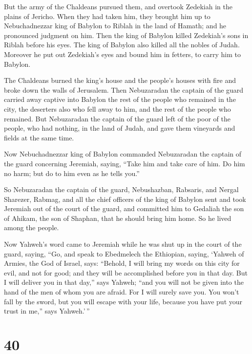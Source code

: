  But the army of the Chaldeans pursued them, and overtook
Zedekiah in the plains of Jericho. When they had taken him, they brought
him up to Nebuchadnezzar king of Babylon to Riblah in the land of
Hamath; and he pronounced judgment on him.  Then the king of
Babylon killed Zedekiah's sons in Riblah before his eyes. The king of
Babylon also killed all the nobles of Judah.  Moreover he
put out Zedekiah's eyes and bound him in fetters, to carry him to
Babylon.

 The Chaldeans burned the king's house and the people's
houses with fire and broke down the walls of Jerusalem. 
Then Nebuzaradan the captain of the guard carried away captive into
Babylon the rest of the people who remained in the city, the deserters
also who fell away to him, and the rest of the people who remained.
 But Nebuzaradan the captain of the guard left of the poor
of the people, who had nothing, in the land of Judah, and gave them
vineyards and fields at the same time.

 Now Nebuchadnezzar king of Babylon commanded Nebuzaradan
the captain of the guard concerning Jeremiah, saying, 
``Take him and take care of him. Do him no harm; but do to him even as
he tells you.''

 So Nebuzaradan the captain of the guard, Nebushazban,
Rabsaris, and Nergal Sharezer, Rabmag, and all the chief officers of the
king of Babylon  sent and took Jeremiah out of the court of
the guard, and committed him to Gedaliah the son of Ahikam, the son of
Shaphan, that he should bring him home. So he lived among the people.

 Now Yahweh's word came to Jeremiah while he was shut up in
the court of the guard, saying,  ``Go, and speak to
Ebedmelech the Ethiopian, saying, `Yahweh of Armies, the God of Israel,
says: ``Behold, I will bring my words on this city for evil, and not for
good; and they will be accomplished before you in that day.
 But I will deliver you in that day,'' says Yahweh; ``and
you will not be given into the hand of the men of whom you are afraid.
 For I will surely save you. You won't fall by the sword,
but you will escape with your life, because you have put your trust in
me,'' says Yahweh.'\,''

\hypertarget{section-39}{%
\section{40}\label{section-39}}

